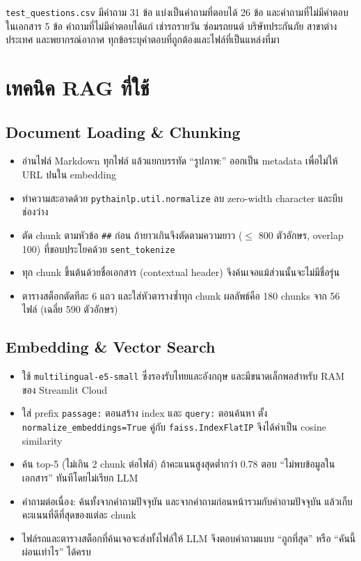 \documentclass[11pt,a4paper]{article}
\begin{document}
\texttt{test\_questions.csv} มีคำถาม 31 ข้อ แบ่งเป็นคำถามที่ตอบได้ 26 ข้อ และคำถามที่ไม่มีคำตอบในเอกสาร 5 ข้อ
คำถามที่ไม่มีคำตอบได้แก่ เช่ารถรายวัน ซ่อมรถยนต์ บริษัทประกันภัย สาขาต่างประเทศ และพยากรณ์อากาศ
ทุกข้อระบุคำตอบที่ถูกต้องและไฟล์ที่เป็นแหล่งที่มา

\section{เทคนิค RAG ที่ใช้}
\subsection{Document Loading \& Chunking}
\begin{itemize}
  \item อ่านไฟล์ Markdown ทุกไฟล์ แล้วแยกบรรทัด ``รูปภาพ:'' ออกเป็น metadata เพื่อไม่ให้ URL ปนใน embedding
  \item ทำความสะอาดด้วย \texttt{pythainlp.util.normalize} ลบ zero-width character และบีบช่องว่าง
  \item ตัด chunk ตามหัวข้อ \texttt{\#\#} ก่อน ถ้ายาวเกินจึงตัดตามความยาว ($\le$ 800 ตัวอักษร, overlap 100) ที่ขอบประโยคด้วย \texttt{sent\_tokenize}
  \item ทุก chunk ขึ้นต้นด้วยชื่อเอกสาร (contextual header) จึงค้นเจอแม้ส่วนนั้นจะไม่มีชื่อรุ่น
  \item ตารางสต็อกตัดทีละ 6 แถว และใส่หัวตารางซ้ำทุก chunk ผลลัพธ์คือ 180 chunks จาก 56 ไฟล์ (เฉลี่ย 590 ตัวอักษร)
\end{itemize}

\subsection{Embedding \& Vector Search}
\begin{itemize}
  \item ใช้ \texttt{multilingual-e5-small} ซึ่งรองรับไทยและอังกฤษ และมีขนาดเล็กพอสำหรับ RAM ของ Streamlit Cloud
  \item ใส่ prefix \texttt{passage:} ตอนสร้าง index และ \texttt{query:} ตอนค้นหา ตั้ง \texttt{normalize\_embeddings=True} คู่กับ \texttt{faiss.IndexFlatIP} จึงได้ค่าเป็น cosine similarity
  \item ค้น top-5 (ไม่เกิน 2 chunk ต่อไฟล์) ถ้าคะแนนสูงสุดต่ำกว่า 0.78 ตอบ ``ไม่พบข้อมูลในเอกสาร'' ทันทีโดยไม่เรียก LLM
  \item คำถามต่อเนื่อง: ค้นทั้งจากคำถามปัจจุบัน และจากคำถามก่อนหน้ารวมกับคำถามปัจจุบัน แล้วเก็บคะแนนที่ดีที่สุดของแต่ละ chunk
  \item ไฟล์รถและตารางสต็อกที่ค้นเจอจะส่งทั้งไฟล์ให้ LLM จึงตอบคำถามแบบ ``ถูกที่สุด'' หรือ ``คันนี้ผ่อนเท่าไร'' ได้ครบ
\end{itemize}
\end{document}
